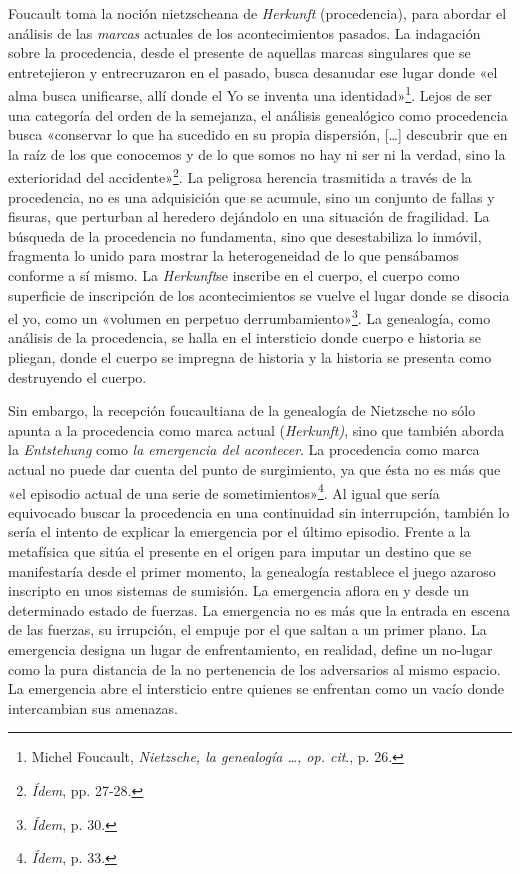 Foucault toma la noción nietzscheana de \emph{Herkunft} (procedencia), para abordar el análisis de las \emph{marcas} actuales de los acontecimientos pasados. La indagación sobre la procedencia, desde el presente de aquellas marcas singulares que se entretejieron y entrecruzaron en el pasado, busca desanudar ese lugar donde «el alma busca unificarse, allí donde el Yo se inventa una identidad»\footnote{Michel Foucault, \emph{Nietzsche, la genealogía \ldots, op. cit}., p. 26.}. Lejos de ser una categoría del orden de la semejanza, el análisis genealógico como procedencia busca «conservar lo que ha sucedido en su propia dispersión, {[}\ldots{]} descubrir que en la raíz de los que conocemos y de lo que somos no hay ni ser ni la verdad, sino la exterioridad del accidente»\footnote{\emph{Ídem}, pp. 27-28.}. La peligrosa herencia trasmitida a través de la procedencia, no es una adquisición que se acumule, sino un conjunto de fallas y fisuras, que perturban al heredero dejándolo en una situación de fragilidad. La búsqueda de la procedencia no fundamenta, sino que desestabiliza lo inmóvil, fragmenta lo unido para mostrar la heterogeneidad de lo que pensábamos conforme a sí mismo. La \emph{Herkunft}se inscribe en el cuerpo, el cuerpo como superficie de inscripción de los acontecimientos se vuelve el lugar donde se disocia el yo, como un «volumen en perpetuo derrumbamiento»\footnote{\emph{Ídem}, p. 30.}. La genealogía, como análisis de la procedencia, se halla en el intersticio donde cuerpo e historia se pliegan, donde el cuerpo se impregna de historia y la historia se presenta como destruyendo el cuerpo.

Sin embargo, la recepción foucaultiana de la genealogía de Nietzsche no sólo apunta a la procedencia como marca actual (\emph{Herkunft)}, sino que también aborda la \emph{Entstehung} como \emph{la emergencia del acontecer}. La procedencia como marca actual no puede dar cuenta del punto de surgimiento, ya que ésta no es más que «el episodio actual de una serie de sometimientos»\footnote{\emph{Ídem}, p. 33.}. Al igual que sería equivocado buscar la procedencia en una continuidad sin interrupción, también lo sería el intento de explicar la emergencia por el último episodio. Frente a la metafísica que sitúa el presente en el origen para imputar un destino que se manifestaría desde el primer momento, la genealogía restablece el juego azaroso inscripto en unos sistemas de sumisión. La emergencia aflora en y desde un determinado estado de fuerzas. La emergencia no es más que la entrada en escena de las fuerzas, su irrupción, el empuje por el que saltan a un primer plano. La emergencia designa un lugar de enfrentamiento, en realidad, define un no-lugar como la pura distancia de la no pertenencia de los adversarios al mismo espacio. La emergencia abre el intersticio entre quienes se enfrentan como un vacío donde intercambian sus amenazas.

